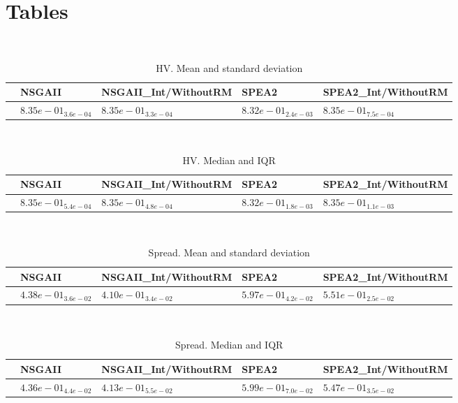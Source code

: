 \documentclass{article}
\title{}
\author{}
\begin{document}
\maketitle
\section{Tables}
\
\begin{table}
\caption{HV. Mean and standard deviation}
\label{table:mean.HV}
\centering
\begin{scriptsize}
\begin{tabular}{lllll}
\hline & NSGAII & NSGAII\_Int/WithoutRM & SPEA2 &  SPEA2\_Int/WithoutRM\\
\hline
 & $  8.35e-01_{ 3.6e-04}$ & \cellcolor{gray95}$  8.35e-01_{ 3.3e-04}$ & $  8.32e-01_{ 2.4e-03}$ & \cellcolor{gray25}$  8.35e-01_{ 7.5e-04}$ \\
\hline
\end{tabular}
\end{scriptsize}
\end{table}
\
\begin{table}
\caption{HV. Median and IQR}
\label{table:median.HV}
\begin{scriptsize}
\centering
\begin{tabular}{lllll}
\hline & NSGAII & NSGAII\_Int/WithoutRM & SPEA2 &  SPEA2\_Int/WithoutRM\\
\hline
 & $  8.35e-01_{ 5.4e-04}$ & \cellcolor{gray95}$  8.35e-01_{ 4.8e-04}$ & $  8.32e-01_{ 1.8e-03}$ & \cellcolor{gray25}$  8.35e-01_{ 1.1e-03}$ \\
\hline
\end{tabular}
\end{scriptsize}
\end{table}
\
\begin{table}
\caption{Spread. Mean and standard deviation}
\label{table:mean.Spread}
\centering
\begin{scriptsize}
\begin{tabular}{lllll}
\hline & NSGAII & NSGAII\_Int/WithoutRM & SPEA2 &  SPEA2\_Int/WithoutRM\\
\hline
 & \cellcolor{gray25}$  4.38e-01_{ 3.6e-02}$ & \cellcolor{gray95}$  4.10e-01_{ 3.4e-02}$ & $  5.97e-01_{ 4.2e-02}$ & $  5.51e-01_{ 2.5e-02}$ \\
\hline
\end{tabular}
\end{scriptsize}
\end{table}
\
\begin{table}
\caption{Spread. Median and IQR}
\label{table:median.Spread}
\begin{scriptsize}
\centering
\begin{tabular}{lllll}
\hline & NSGAII & NSGAII\_Int/WithoutRM & SPEA2 &  SPEA2\_Int/WithoutRM\\
\hline
 & \cellcolor{gray25}$  4.36e-01_{ 4.4e-02}$ & \cellcolor{gray95}$  4.13e-01_{ 5.5e-02}$ & $  5.99e-01_{ 7.0e-02}$ & $  5.47e-01_{ 3.5e-02}$ \\
\hline
\end{tabular}
\end{scriptsize}
\end{table}
\end{document}
